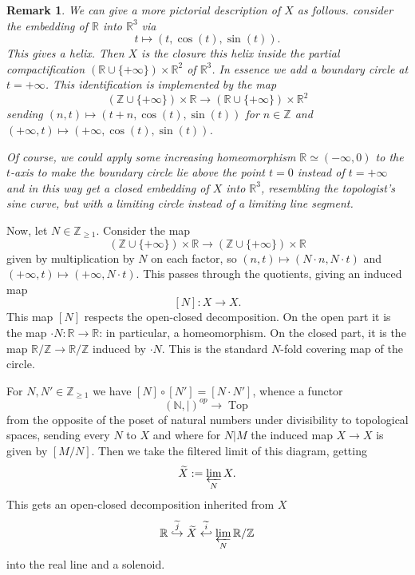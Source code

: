 \documentclass[12pt]{article}
\newtheorem{remark}[theorem]{Remark}
\newcommand{\on}{\operatorname}
\begin{document}
\begin{remark}\label{explicittopology}
We can give a more pictorial description of $X$ as follows.  consider the embedding of $\mathbb{R}$ into $\mathbb{R}^3$ via
$$t\mapsto (t,\on{cos}(t),\on{sin}(t)).$$
This gives a helix.  Then $X$ is the closure this helix inside the partial compactification $(\mathbb{R}\cup\{+\infty\})\times\mathbb{R}^2$ of $\mathbb{R}^3$.  In essence we add a boundary circle at $t=+\infty$.  This identification is implemented by the map
$$(\mathbb{Z}\cup\{+\infty\})\times\mathbb{R}\rightarrow (\mathbb{R}\cup\{+\infty\})\times\mathbb{R}^2$$
sending $(n,t)\mapsto (t+n,\on{cos}(t),\on{sin}(t))$  for $n\in\mathbb{Z}$ and $(+\infty,t)\mapsto (+\infty,\on{cos}(t),\on{sin}(t))$.

Of course, we could apply some increasing homeomorphism $\mathbb{R} \simeq (-\infty,0)$ to the $t$-axis to make the boundary circle lie above the point $t=0$ instead of $t=+\infty$ and in this way get a closed embedding of $X$ into $\mathbb{R}^3$, resembling the topologist's sine curve, but with a limiting circle instead of a limiting line segment.
\end{remark}

Now, let $N\in\mathbb{Z}_{\geq 1}$.  Consider the map
$$(\mathbb{Z}\cup\{+\infty\})\times\mathbb{R}\rightarrow (\mathbb{Z}\cup\{+\infty\})\times\mathbb{R}$$
given by multiplication by $N$ on each factor, so $(n,t)\mapsto (N\cdot n,N\cdot t)$ and $(+\infty,t)\mapsto (+\infty,N\cdot t)$.  This passes through the quotients, giving an induced map
$$[N]:X\rightarrow X.$$
This map $[N]$ respects the open-closed decomposition.  On the open part it is the map $\cdot N:\mathbb{R}\rightarrow\mathbb{R}$: in particular, a homeomorphism.  On the closed part, it is the map $\mathbb{R}/\mathbb{Z}\rightarrow\mathbb{R}/\mathbb{Z}$ induced by $\cdot N$.  This is the standard $N$-fold covering map of the circle.

For $N,N'\in\mathbb{Z}_{\geq 1}$ we have $[N]\circ [N']=[N\cdot N']$, whence a functor
$$(\mathbb{N},|)^{op}\rightarrow \on{Top}$$
from the opposite of the poset of natural numbers under divisibility to topological spaces, sending every $N$ to $X$ and where for $N|M$ the induced map $X\rightarrow X$ is given by $[M/N]$.  Then we take the filtered limit of this diagram, getting
$$\widetilde{X} := \varprojlim_N X.$$
This gets an open-closed decomposition inherited from $X$
$$\mathbb{R}\overset{\widetilde{j}}{\hookrightarrow} \widetilde{X}\overset{\widetilde{i}}{\hookleftarrow} \varprojlim_N \mathbb{R}/\mathbb{Z}$$
into the real line and a solenoid.
\end{document}
